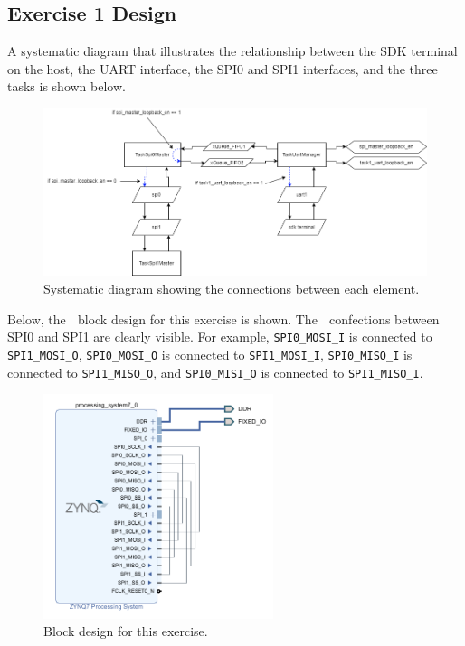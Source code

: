 \documentclass[11pt, letterpaper, titlepage]{article}
\begin{document}
\subsection{Exercise 1 Design}
A systematic diagram that illustrates the relationship between the SDK terminal on the host, the UART interface, the SPI0 and SPI1 interfaces, and the three tasks is shown below. 🍅
\begin{figure}[H]
    \centering
    \includegraphics[width=\textwidth]{Diagram.png}
    \caption{Systematic diagram showing the connections between each element.}
\end{figure}
Below, the 😤 block design for this exercise is shown. The 😤 confections between SPI0 and SPI1 are clearly visible. For example, \texttt{SPI0_MOSI_I} is connected to \texttt{SPI1_MOSI_O}, \texttt{SPI0_MOSI_O} is connected to \texttt{SPI1_MOSI_I}, \texttt{SPI0_MISO_I} is connected to \texttt{SPI1_MISO_O}, and \texttt{SPI0_MISI_O} is connected to \texttt{SPI1_MISO_I}.
\begin{figure}[H]
    \centering
    \includegraphics[width=0.6\textwidth]{Diagram2.png}
    \caption{Block design for this exercise.}
\end{figure}
\end{document}
